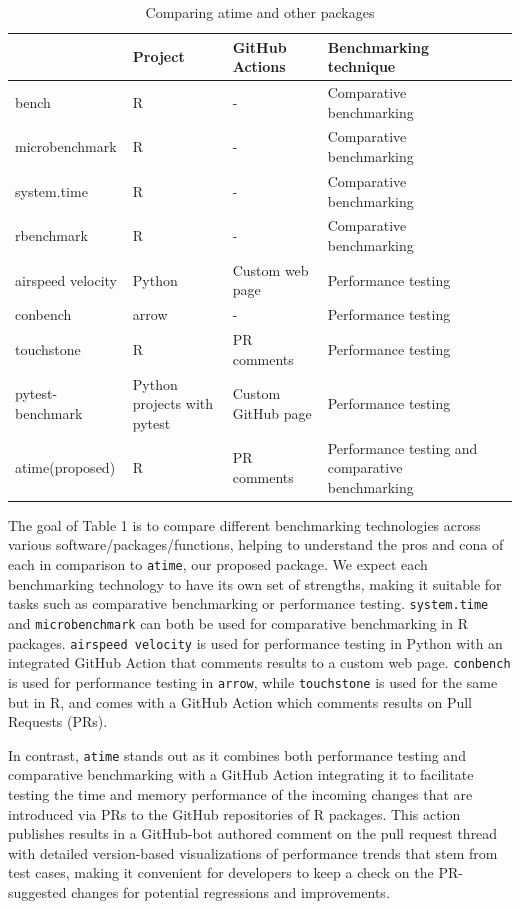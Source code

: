 \begin{table}[H]
    \centering
        \caption{Comparing atime and other packages}
    \begin{tabular}{|m{2.6cm}|m{2cm}|m{3cm}|m{3cm}|m{4cm}|}
    \hline
         & Project & GitHub Actions & Benchmarking technique\\
\hline
bench & R  & - &  Comparative benchmarking \\

\hline
microbenchmark & R & - & Comparative benchmarking\\
\hline
system.time & R & - & Comparative benchmarking\\
\hline
rbenchmark & R & - & Comparative benchmarking\\
\hline
airspeed velocity & Python & Custom web page & Performance testing\\
\hline
conbench & arrow  & - & Performance testing\\
\hline
touchstone & R & PR comments & Performance testing\\
\hline
pytest-benchmark & Python
projects with
pytest & Custom GitHub page & Performance testing\\
\hline
atime(proposed) & R & PR comments & Performance testing and comparative benchmarking\\
\hline
    \end{tabular}
    \label{tab:my_label}
\end{table}

\noindent The goal of Table 1 is to compare different benchmarking technologies across various software/packages/functions, helping to understand the pros and cona of each in comparison to \texttt{atime}, our proposed package. We expect each benchmarking technology to have its own set of strengths, making it suitable for tasks such as comparative benchmarking or performance testing. \texttt{system.time} and \texttt{microbenchmark} can both be used for comparative benchmarking in R packages. \texttt{airspeed velocity} is used for performance testing in Python with an integrated GitHub Action that comments results to a custom web page. \texttt{conbench} is used for performance testing in \texttt{arrow}, while \texttt{touchstone} is used for the same but in R, and comes with a GitHub Action which comments results on Pull Requests (PRs).

In contrast, \texttt{atime} stands out as it combines both performance testing and comparative benchmarking with a GitHub Action integrating it to facilitate testing the time and memory performance of the incoming changes that are introduced via PRs to the GitHub repositories of R packages. This action publishes results in a GitHub-bot authored comment on the pull request thread with detailed version-based visualizations of performance trends that stem from test cases, making it convenient for developers to keep a check on the PR-suggested changes for potential regressions and improvements.\\

